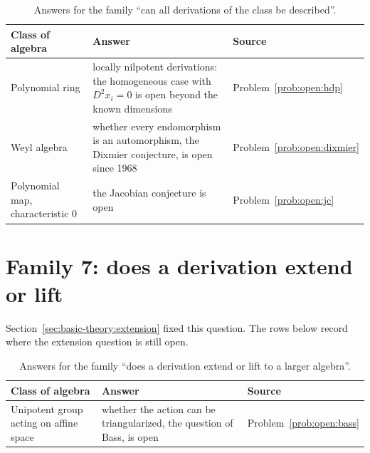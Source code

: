 \begin{table}[htbp]
  \centering
  \caption{Answers for the family ``can all derivations of the class be
  described''.} %
  \label{tab:q:describe}
  \begin{tabular}{p{}p{}p{}}
    \toprule
    Class of algebra & Answer & Source \\ %
    \midrule
    Polynomial ring & locally nilpotent derivations: the homogeneous case %
      with $D^2x_i=0$ is open beyond the known dimensions & %
      Problem~\ref{prob:open:hdp} \\ %
    Weyl algebra & whether every endomorphism is an automorphism, the %
      Dixmier conjecture, is open since 1968 & %
      Problem~\ref{prob:open:dixmier} \\ %
    Polynomial map, characteristic $0$ & the Jacobian conjecture is open & %
      Problem~\ref{prob:open:jc} \\ %
    \bottomrule
  \end{tabular}
\end{table}

\section{Family 7: does a derivation extend or lift}

Section~\ref{sec:basic-theory:extension} fixed this question. %
The rows below record where the extension question is still open. %

\begin{table}[htbp]
  \centering
  \caption{Answers for the family ``does a derivation extend or lift to a
  larger algebra''.} %
  \label{tab:q:extension}
  \begin{tabular}{p{}p{}p{}}
    \toprule
    Class of algebra & Answer & Source \\ %
    \midrule
    Unipotent group acting on affine space & whether the action can be %
      triangularized, the question of Bass, is open & %
      Problem~\ref{prob:open:bass} \\ %
    \bottomrule
  \end{tabular}
\end{table}

